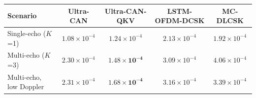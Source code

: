 \begin{tabular}{lcccc}
\toprule
Scenario & Ultra-CAN & Ultra-CAN-QKV & LSTM-OFDM-DCSK & MC-DLCSK \\
\midrule
Single-echo ($K$=1) & $1.08\times10^{-4}$ & $1.24\times10^{-4}$ & $2.13\times10^{-4}$ & $1.92\times10^{-4}$ \\
Multi-echo ($K$=3) & $2.30\times10^{-4}$ & $\mathbf{1.48\times10^{-4}}$ & $3.09\times10^{-4}$ & $4.06\times10^{-4}$ \\
Multi-echo, low Doppler & $2.31\times10^{-4}$ & $\mathbf{1.68\times10^{-4}}$ & $3.16\times10^{-4}$ & $3.39\times10^{-4}$ \\
\bottomrule
\end{tabular}

